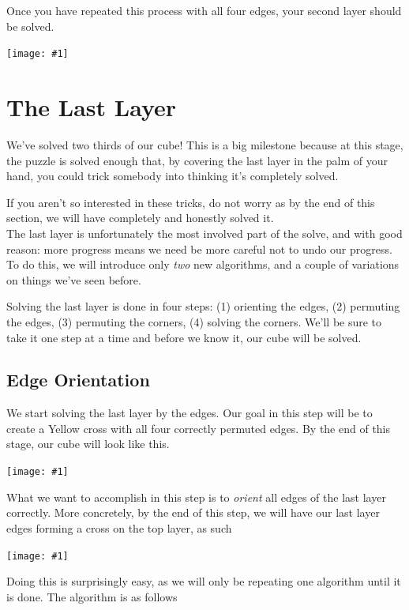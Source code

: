 \documentclass[12pt,letterpaper]{article}
\newcommand{\pic}[1]{
  \begin{center}
	  \texttt{[image: \#1]}
  \end{center}
}
\begin{document}
Once you have repeated this process with all four edges, your second layer
should be solved.

\pic{second_layer/f2l}



\newpage

\section{The Last Layer}

We've solved two thirds of our cube! This is a big milestone because at this
stage, the puzzle is solved enough that, by covering the last layer in the palm
of your hand, you could trick somebody into thinking it's completely solved.

If you aren't so interested in these tricks, do not worry as by the end of
this section, we will have completely and honestly solved it. \\

The last layer is unfortunately the most involved part of the solve, and with
good reason: more progress means we need be more careful not to undo our
progress. To do this, we will introduce only {\it two} new algorithms, and a
couple of variations on things we've seen before.

Solving the last layer is done in four steps: (1) orienting the edges, (2)
permuting the edges, (3) permuting the corners, (4) solving the corners. We'll
be sure to take it one step at a time and before we know it, our cube will be
solved.

\subsection{Edge Orientation}

We start solving the last layer by the edges. Our goal in this step will be to
create a {\sc Yellow} cross with all four correctly permuted edges. By the end
of this stage, our cube will look like this.

\pic{last_layer/f2l_cross}

What we want to accomplish in this step is to {\it orient} all edges of the last
layer correctly. More concretely, by the end of this step, we will have our
last layer edges forming a cross on the top layer, as such

\pic{last_layer/f2l_cross_up}

Doing this is surprisingly easy, as we will only be repeating one algorithm until
it is done. The algorithm is as follows
\end{document}
